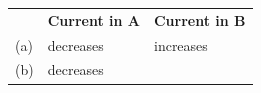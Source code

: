 \begin{enumerate}[noitemsep, label=\textbf{\arabic*}. ]
\begin{enumerate}[noitemsep, label=\textbf{\alph*}. ]
{\begin{tabular}[t]{|l|l|l|}
    
         &
    
    
        \textbf{Current in A} &
    
    
        \textbf{Current in B}%
     \tabularnewline\cline{1-1}\cline{2-2}\cline{3-3}
    
    
        (a) &
    
    
        decreases &
    
    
        increases%
     \tabularnewline\cline{1-1}\cline{2-2}\cline{3-3}
    
    
        (b) &
    
    
        decreases &
    
    

\end{tabular}}
\end{enumerate}
\end{enumerate}
